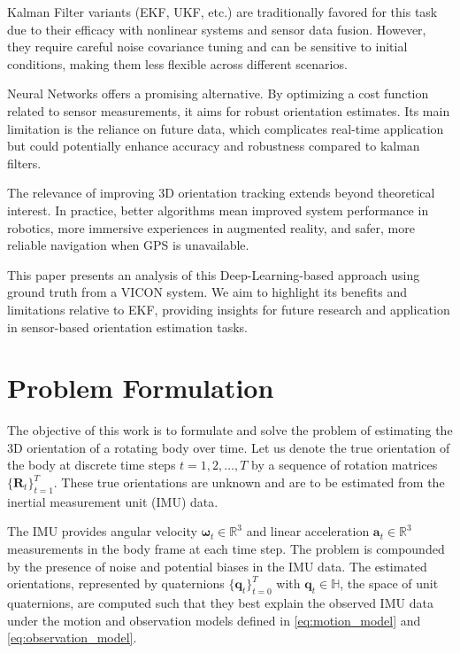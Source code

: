 \documentclass[conference]{IEEEtran}
\begin{document}
Kalman Filter variants (EKF, UKF, etc.) are traditionally favored for this task due to their efficacy with nonlinear
systems and sensor data fusion. However, they require careful noise covariance tuning and can be sensitive to initial conditions, making them less flexible across different scenarios.

Neural Networks offers a promising alternative. By optimizing a cost function related to sensor
measurements, it aims for robust orientation estimates. Its main limitation is the reliance on future data, which
complicates real-time application but could potentially enhance accuracy and robustness compared to kalman filters.

The relevance of improving 3D orientation tracking extends beyond theoretical interest. In practice, better algorithms mean improved system performance in robotics, more immersive experiences in augmented reality, and safer, more reliable navigation when GPS is unavailable.

This paper presents an analysis of this Deep-Learning-based approach using ground truth from a VICON system. We aim to highlight its benefits and limitations relative to EKF, providing insights for future research and application in sensor-based orientation estimation tasks.

\section{Problem Formulation}

The objective of this work is to formulate and solve the problem of estimating the 3D orientation of a rotating body
over time. Let us denote the true orientation of the body at discrete time steps \( t = 1, 2, \ldots, T \) by a sequence
of rotation matrices \( \{\bm{R}_t\}_{t=1}^T \). These true orientations are unknown and are to be estimated from the inertial measurement unit (IMU) data.

The IMU provides angular velocity \( \bm{\omega}_t \in \mathbb{R}^3 \) and linear acceleration \( \bm{a}_t \in \mathbb{R}^3 \)
measurements in the body frame at each time step. The problem is compounded by the presence of noise and potential
biases in the IMU data. The estimated orientations, represented by quaternions \( \{\bm{q}_t\}_{t=0}^T \) with \( \bm{q}
_t \in \mathbb{H} \), the space of unit quaternions, are computed such that they best explain the observed IMU data
under the motion and observation models defined in \ref{eq:motion_model} and \ref{eq:observation_model}.
\end{document}
